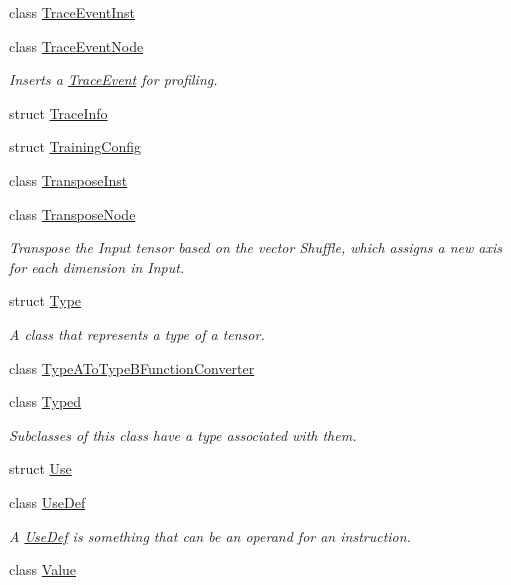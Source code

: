 \begin{DoxyCompactItemize}
\item 
class \hyperlink{classglow_1_1_trace_event_inst}{Trace\+Event\+Inst}
\item 
class \hyperlink{classglow_1_1_trace_event_node}{Trace\+Event\+Node}
\begin{DoxyCompactList}\small\item\em Inserts a \hyperlink{structglow_1_1_trace_event}{Trace\+Event} for profiling. \end{DoxyCompactList}\item 
struct \hyperlink{structglow_1_1_trace_info}{Trace\+Info}
\item 
struct \hyperlink{structglow_1_1_training_config}{Training\+Config}
\item 
class \hyperlink{classglow_1_1_transpose_inst}{Transpose\+Inst}
\item 
class \hyperlink{classglow_1_1_transpose_node}{Transpose\+Node}
\begin{DoxyCompactList}\small\item\em Transpose the Input tensor based on the vector Shuffle, which assigns a new axis for each dimension in Input. \end{DoxyCompactList}\item 
struct \hyperlink{structglow_1_1_type}{Type}
\begin{DoxyCompactList}\small\item\em A class that represents a type of a tensor. \end{DoxyCompactList}\item 
class \hyperlink{classglow_1_1_type_a_to_type_b_function_converter}{Type\+A\+To\+Type\+B\+Function\+Converter}
\item 
class \hyperlink{classglow_1_1_typed}{Typed}
\begin{DoxyCompactList}\small\item\em Subclasses of this class have a type associated with them. \end{DoxyCompactList}\item 
struct \hyperlink{structglow_1_1_use}{Use}
\item 
class \hyperlink{classglow_1_1_use_def}{Use\+Def}
\begin{DoxyCompactList}\small\item\em A \hyperlink{classglow_1_1_use_def}{Use\+Def} is something that can be an operand for an instruction. \end{DoxyCompactList}\item 
class \hyperlink{classglow_1_1_value}{Value}
\item 

\end{DoxyCompactItemize}
